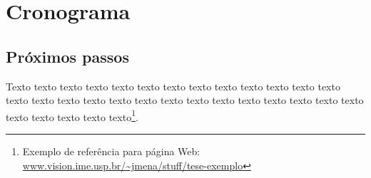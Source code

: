 \chapter{Cronograma}
\label{cap:cronograma}

\section{Próximos passos}

Texto texto texto texto texto texto texto texto texto texto texto texto texto
texto texto texto texto texto texto texto texto texto texto texto texto texto
texto texto texto texto texto texto\footnote{Exemplo de referência para página
Web: \url{www.vision.ime.usp.br/~jmena/stuff/tese-exemplo}}.

